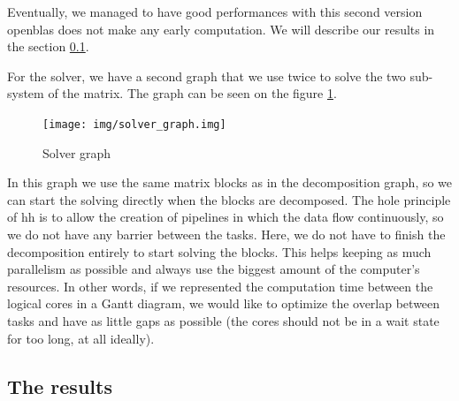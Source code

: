Eventually, we managed to have good performances with this second version
openblas does not make any early computation. We will describe our results in
the section \ref{sec:chores}.

For the solver, we have a second graph that we use twice to solve the two
sub-system of the matrix. The graph can be seen on the figure
\ref{fig:solvergraph}.

\begin{figure}[h!]
  \begin{center}
    \texttt{[image: img/solver\_graph.img]}
    \caption{Solver graph}
    \label{fig:solvergraph}
  \end{center}
\end{figure}

In this graph we use the same matrix blocks as in the decomposition graph, so
we can start the solving directly when the blocks are decomposed. The hole
principle of \gls{hh} is to allow the creation of pipelines in which the data
flow continuously, so we do not have any barrier between the tasks. Here, we do
not have to finish the decomposition entirely to start solving the blocks. This
helps keeping as much parallelism as possible and always use the biggest amount
of the computer's resources. In other words, if we represented the computation
time between the logical cores in a Gantt diagram, we would like to optimize the
overlap between tasks and have as little gaps as possible (the cores should
not be in a wait state for too long, at all ideally).

\subsection{The results}
\label{sec:chores}
